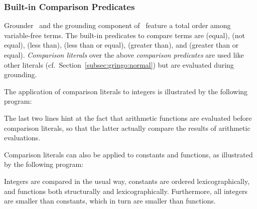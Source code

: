 \subsubsection{Built-in Comparison Predicates}\label{subsec:gringo:comp}

Grounder \gringo\ and the grounding component of \clingo\
feature a total order among variable-free terms.
The built-in predicates to compare terms are
\code{=} (equal),
\code{!=} (not equal),
\code{<} (less than),
\code{<=} (less than or equal),
\code{>} (greater than), and
\code{>=} (greater than or equal).
\emph{Comparison literals} over the above \emph{comparison predicates} are used like
other literals (cf.\ Section~\ref{subsec:gringo:normal})
but are evaluated during grounding.

\begin{example}\label{ex:arith:pred}
The application of comparison literals to integers
is illustrated by the following program:%
%

%
The last two lines hint at the fact that arithmetic functions are evaluated
before comparison literals, so that the latter actually compare the
results of arithmetic evaluations.
\end{example}

\begin{example}\label{ex:symb:pred}
Comparison literals can also be applied to constants and functions,
as illustrated by the following program:%
%

%
Integers are compared in the usual way, constants are ordered lexicographically,
and functions both structurally and lexicographically.
Furthermore, all integers are smaller than constants,
which in turn are smaller than functions.
\end{example}

